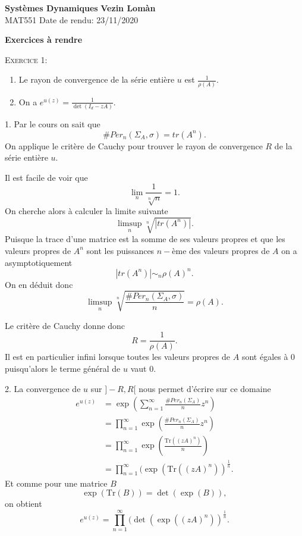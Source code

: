 \documentclass[12pt]{article}
\newenvironment{ex}[1]
{\begin{mdframed}[linewidth=0.6pt]
        \textsc{Exercice #1:}

}
    {\end{mdframed}}
\begin{document}
        \noindent
\textbf{Systèmes Dynamiques} \hfill \textbf{Vezin Lomàn}\\
\normalsize MAT551 \hfill Date de rendu: 23/11/2020\\

\begin{center}
\textbf{Exercices à rendre}
\end{center}

\begin{ex}{1}
       \begin{enumerate}
               \item Le rayon de convergence de la série entière $u$ est $\frac{1}{\rho(A)}$.
               \item On a $e^{u(z)} = \frac{1}{\det(I_{d}-zA)}$.
       \end{enumerate} 
\end{ex}

1. Par le cours on sait que \[
        \#Per_{n}(\Sigma_{A},\sigma) = tr(A^{n})
.\] On applique le critère de Cauchy pour trouver le rayon de convergence $R$ de la série entière $u$.

Il est facile de voir que  \[
        \lim_{n} \frac{1}{\sqrt[n]{n}} = 1
.\] On cherche alors à calculer la limite suivante \[
\limsup_{n} \sqrt[n]{|tr(A^{n})|} 
.\] Puisque la trace d'une matrice est la somme de ses valeurs propres et que les valeurs propres de $A^{n}$ sont les puissances $n-$ème des valeurs propres de $A$ on a asymptotiquement \[
|tr(A^{n})| \sim_{n} \rho(A)^{n}
.\] On en déduit donc \[
\limsup_{n} \sqrt[n]{\frac{\#Per_{n}(\Sigma_{A}, \sigma)}{n}} = \rho(A)
.\]  

Le critère de Cauchy donne donc \[
        R = \frac{1}{\rho(A)}
.\] Il est en particulier infini lorsque toutes les valeurs propres de $A$ sont égales à 0 puisqu'alors le terme général de $u$ vaut 0. 

\bigskip

2. La convergence de $u$ sur $]-R,R[$ nous permet d'écrire sur ce domaine
 \begin{align*}
         e^{u(z)} &= \exp(\sum_{n=1}^{\infty} \frac{\#Per_{n}(\Sigma_{A})}{n}z^{n}) \\
                  &= \prod_{n=1}^{\infty} \exp(\frac{\#Per_{n}(\Sigma_{A})}{n}z^{n}) \\
                  &= \prod_{n=1}^{\infty} \exp(\frac{\mathrm{Tr}((zA)^{n})}{n}) \\
                  &= \prod_{n=1}^{\infty} (\exp(\mathrm{Tr}((zA)^{n}))^{\frac{1}{n}}
.\end{align*}
Et comme pour une matrice $B$ \[
        \exp(\mathrm{Tr}(B)) = \det(\exp(B))
,\] on obtient \[
e^{u(z)} = \prod_{n=1}^{\infty} (\det(\exp((zA)^{n}))^{\frac{1}{n}} 
.\]  
\end{document}
